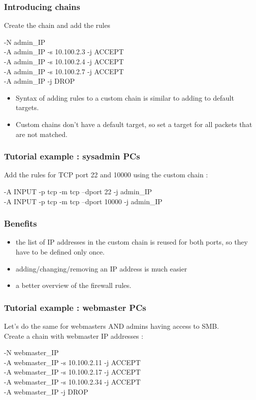 \documentclass[14pt]{beamer}
\begin{document}
  \begin{frame}
    \frametitle{Introducing chains}
    Create the chain and add the rules
    \begin{example}
      \small{-N admin\_IP\\
      \pause
      -A admin\_IP -s 10.100.2.3 -j ACCEPT\\
      -A admin\_IP -s 10.100.2.4 -j ACCEPT\\
      -A admin\_IP -s 10.100.2.7 -j ACCEPT\\
      -A admin\_IP -j DROP}
    \end{example}
    \pause
    \begin{itemize}[<+->]
      \item Syntax of adding rules to a custom chain is similar to adding to default targets.
      \item Custom chains don't have a default target, so set a target for all packets that are not matched.
    \end{itemize}
  \end{frame}
  \begin{frame}
    \frametitle{Tutorial example : sysadmin PCs}
    Add the rules for TCP port 22 and 10000 using the custom chain :
    \begin{example}
      \small{-A INPUT -p tcp -m tcp --dport 22 -j admin\_IP\\
      -A INPUT -p tcp -m tcp --dport 10000 -j admin\_IP}
    \end{example}
  \end{frame}
  \begin{frame}
    \frametitle{Benefits}
    \begin{itemize}
      \item the list of IP addresses in the custom chain is reused for both ports, so they have to be defined only once.
      \item adding/changing/removing an IP address is much easier
      \item a better overview of the firewall rules.
    \end{itemize}
  \end{frame}
  \begin{frame}
    \frametitle{Tutorial example : webmaster PCs}
    Let's do the same for webmasters AND admins having access to SMB.\\
    \pause
    Create a chain with webmaster IP addresses :
    \begin{example}
      \small{-N webmaster\_IP\\
      -A webmaster\_IP -s 10.100.2.11 -j ACCEPT\\
      -A webmaster\_IP -s 10.100.2.17 -j ACCEPT\\
      -A webmaster\_IP -s 10.100.2.34 -j ACCEPT\\
      -A webmaster\_IP -j DROP}
    \end{example}
  \end{frame}
\end{document}

